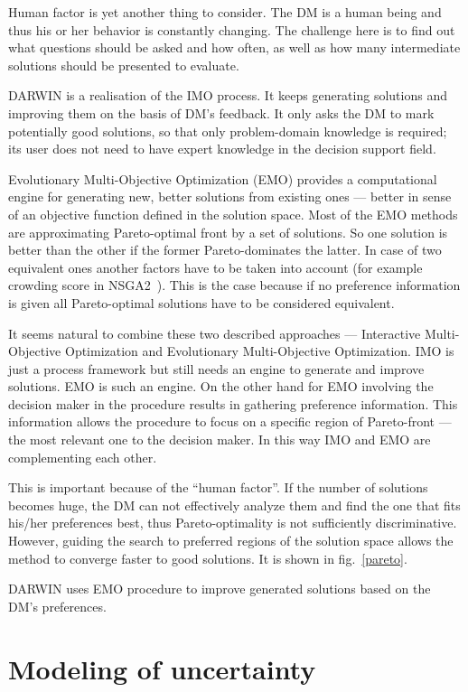 Human factor is yet another thing to consider. The DM is a human being and
thus his or her behavior is constantly changing. The challenge here is to find
out what questions should be asked and how often, as well as how many
intermediate solutions should be presented to evaluate.

DARWIN is a realisation of the IMO process. It keeps generating solutions and
improving them on the basis of DM's feedback. It only asks the DM to mark
potentially good solutions, so that only problem-domain knowledge is required;
its user does not need to have expert knowledge in the decision support field.

Evolutionary Multi-Objective Optimization (EMO) provides a computational
engine for generating new, better solutions from existing ones --- better in
sense of an objective function defined in the solution space. Most of the EMO
methods are approximating Pareto-optimal front by a set of solutions. So one
solution is better than the other if the former Pareto-dominates the
latter. In case of two equivalent ones another factors have to be taken into
account (for example crowding score in NSGA2~\cite{Deb00}). This is the case
because if no preference information is given all Pareto-optimal solutions
have to be considered equivalent.

It seems natural to combine these two described approaches --- Interactive
Multi-Objective Optimization and Evolutionary Multi-Objective
Optimization. IMO is just a process framework but still needs an engine to
generate and improve solutions. EMO is such an engine. On the other hand for
EMO involving the decision maker in the procedure results in gathering
preference information. This information allows the procedure to focus on a
specific region of Pareto-front --- the most relevant one to the decision
maker. In this way IMO and EMO are complementing each other.

This is important because of the ``human factor''. If the number of solutions
becomes huge, the DM can not effectively analyze them and find the one that
fits his/her preferences best, thus Pareto-optimality is not sufficiently
discriminative. However, guiding the search to preferred regions of the
solution space allows the method to converge faster to good solutions. It is
shown in fig.~\ref{pareto}.

DARWIN uses EMO procedure to improve generated solutions based on the DM's
preferences.


\section{Modeling of uncertainty}
\label{uncert-mod}

